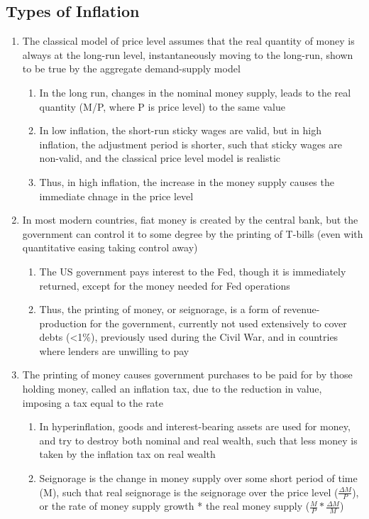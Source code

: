 \subsection{Types of Inflation}
\begin{enumerate}
\item The classical model of price level assumes that the real quantity of money is always at the long-run level, instantaneously moving to the long-run, shown to be true by the aggregate demand-supply model
\begin{enumerate}
\item In the long run, changes in the nominal money supply, leads to the real quantity (M/P, where P is price level) to the same value
\item In low inflation, the short-run sticky wages are valid, but in high inflation, the adjustment period is shorter, such that sticky wages are non-valid, and the classical price level model is realistic
\item Thus, in high inflation, the increase in the money supply causes the immediate chnage in the price level
\end{enumerate}
\item In most modern countries, fiat money is created by the central bank, but the government can control it to some degree by the printing of T-bills (even with quantitative easing taking control away)
\begin{enumerate}
\item The US government pays interest to the Fed, though it is immediately returned, except for the money needed for Fed operations
\item Thus, the printing of money, or seignorage, is a form of revenue-production for the government, currently not used extensively to cover debts (<1\%), previously used during the Civil War, and in countries where lenders are unwilling to pay
\end{enumerate}
\item The printing of money causes government purchases to be paid for by those holding money, called an inflation tax, due to the reduction in value, imposing a tax equal to the rate
\begin{enumerate}
\item In hyperinflation, goods and interest-bearing assets are used for money, and try to destroy both nominal and real wealth, such that less money is taken by the inflation tax on real wealth
\item Seignorage is the change in money supply over some short period of time (\Delta M), such that real seignorage is the seignorage over the price level ($\frac{\Delta M}{P}$), or the rate of money supply growth * the real money supply ($\frac{M}{P}*\frac{\Delta M}{M}$)

\end{enumerate}
\end{enumerate}
